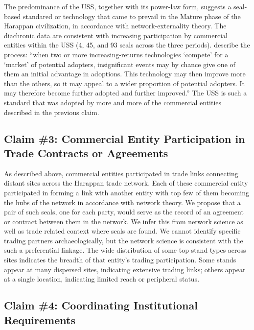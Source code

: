 \documentclass[12pt]{article}
\begin{document}
The predominance of the USS, together with its power-law form, suggests a seal-based
standared or technology that came to prevail in the Mature phase of the Harappan
civilization, in accordance with network-externality theory. The diachronic data are
consistent with increasing participation by commercial entities within the USS (4, 45,
and 93 seals across the three periods).  \citet{arthur1989competing} describe the
process: ``when two or more increasing-returns technologies `compete' for a `market'
of potential adopters, insignificant events may by chance give one of them an initial
advantage in adoptions. This technology may then improve more than the others, so it
may appeal to a wider proportion of potential adopters. It may therefore become
further adopted and further improved.'' The USS is such a standard that was adopted
by more and more of the commercial entities described in the previous claim.

\subsection{Claim \#3: Commercial Entity Participation in Trade Contracts or Agreements}

As described above, commercial entities participated in trade links connecting distant
sites across the Harappan trade network. Each of these commercial entity participated in
forming a link with another entity with top few of them becoming the hubs of the network
in accordance with network theory.  We propose that a pair of such seals, one for each
party, would serve as the record of an agreement or contract between them in the network.
We infer this from network science as well as trade related context where seals are found.
We cannot identify specific trading partners archaeologically, but the network science
is consistent with the such a preferential linkage. The wide distribution of some
top stand types across sites indicates the breadth of that entity's trading
participation. Some stands appear at many dispersed sites, indicating extensive
trading links; others appear at a single location, indicating limited reach or
peripheral status.

\subsection{Claim \#4: Coordinating Institutional Requirements}
\end{document}
